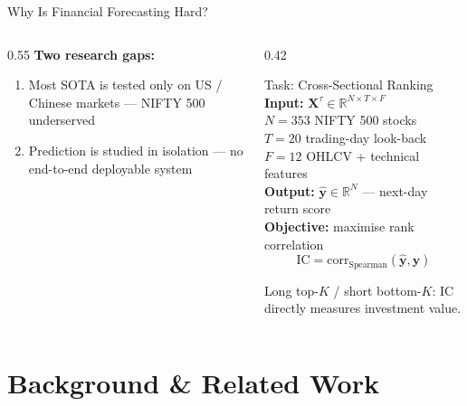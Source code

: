 \documentclass[aspectratio=169, 10pt]{beamer}
\newcommand{\myvec}[1]{\mathbf{#1}}
\begin{document}
\begin{frame}{Why Is Financial Forecasting Hard?}
\begin{columns}[T]
\begin{column}{0.55\textwidth}
      \medskip
      \textbf{Two research gaps:}
      \begin{enumerate}\setlength{\itemsep}{2pt}
        \item Most SOTA is tested only on US / Chinese markets — \alert{NIFTY 500 underserved}
        \item Prediction is studied \alert{in isolation} — no end-to-end deployable system
      \end{enumerate}
    \end{column}
    \begin{column}{0.42\textwidth}
      \begin{block}{Task: Cross-Sectional Ranking}
        \textbf{Input:} $\myvec{X}^\tau \in \mathbb{R}^{N \times T \times F}$\\
        \quad $N=353$ NIFTY 500 stocks\\
        \quad $T=20$ trading-day look-back\\
        \quad $F=12$ OHLCV + technical features
        \smallskip\\
        \textbf{Output:} $\hat{\myvec{y}} \in \mathbb{R}^{N}$ — next-day return score
        \smallskip\\
        \textbf{Objective:} maximise rank correlation
        \[ \text{IC} = \text{corr}_\text{Spearman}(\hat{\myvec{y}}, \myvec{y}) \]
      \end{block}
      \footnotesize
      Long top-$K$ / short bottom-$K$: IC directly measures investment value.
    \end{column}
  \end{columns}
\end{frame}

\section{Background \& Related Work}
\end{document}

